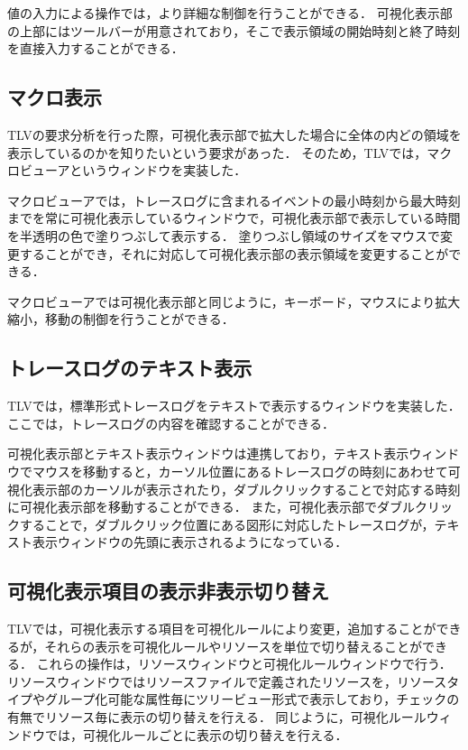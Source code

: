 値の入力による操作では，より詳細な制御を行うことができる．
可視化表示部の上部にはツールバーが用意されており，そこで表示領域の開始時刻と終了時刻を直接入力することができる．

\subsection{マクロ表示}

TLVの要求分析を行った際，可視化表示部で拡大した場合に全体の内どの領域を表示しているのかを知りたいという要求があった．
そのため，TLVでは，マクロビューアというウィンドウを実装した．

マクロビューアでは，トレースログに含まれるイベントの最小時刻から最大時刻までを常に可視化表示しているウィンドウで，可視化表示部で表示している時間を半透明の色で塗りつぶして表示する．
塗りつぶし領域のサイズをマウスで変更することができ，それに対応して可視化表示部の表示領域を変更することができる．

マクロビューアでは可視化表示部と同じように，キーボード，マウスにより拡大縮小，移動の制御を行うことができる．

\subsection{トレースログのテキスト表示}

TLVでは，標準形式トレースログをテキストで表示するウィンドウを実装した．
ここでは，トレースログの内容を確認することができる．

可視化表示部とテキスト表示ウィンドウは連携しており，テキスト表示ウィンドウでマウスを移動すると，カーソル位置にあるトレースログの時刻にあわせて可視化表示部のカーソルが表示されたり，ダブルクリックすることで対応する時刻に可視化表示部を移動することができる．
また，可視化表示部でダブルクリックすることで，ダブルクリック位置にある図形に対応したトレースログが，テキスト表示ウィンドウの先頭に表示されるようになっている．

\subsection{可視化表示項目の表示非表示切り替え}

TLVでは，可視化表示する項目を可視化ルールにより変更，追加することができるが，それらの表示を可視化ルールやリソースを単位で切り替えることができる．
これらの操作は，リソースウィンドウと可視化ルールウィンドウで行う．
リソースウィンドウではリソースファイルで定義されたリソースを，リソースタイプやグループ化可能な属性毎にツリービュー形式で表示しており，チェックの有無でリソース毎に表示の切り替えを行える．
同じように，可視化ルールウィンドウでは，可視化ルールごとに表示の切り替えを行える．
